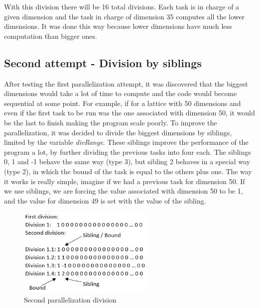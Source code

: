 \documentclass[conference]{IEEEtran}
\begin{document}
With this division there will be 16 total divisions. Each task is in charge of a given dimension and the task in charge of dimension 35 computes all the lower dimensions. It was done this way because lower dimensions have much less computation than bigger ones. 

\subsection{Second attempt - Division by siblings}
After testing the first parallelization attempt, it was discovered that the biggest dimensions would take a lot of time to compute and the code would become sequential at some point. For example, if for a lattice with 50 dimensions and even if the first task to be run was the one associated with dimension 50, it would be the last to finish making the program scale poorly.
To improve the parallelization, it was decided to divide the biggest dimensions by siblings, limited by the variable \emph{divRange}. These siblings improve the performance of the program a lot, by further dividing the previous tasks into four each. The siblings  0, 1 and -1 behave the same way (type 3), but sibling 2 behaves in a special way (type 2), in  which the bound of the task is equal to the others plus one. The way it works is really simple, imagine if we had a previous task for dimension 50. If we use siblings, we are forcing the value associated with dimension 50 to be 1, and the value for dimension 49 is set with the value of the sibling. 

\begin{figure}[ht!]
\centering
\includegraphics[width=65mm]{imgParallel/SegundaParalelizacao}
\caption{Second parallelization division}
\end{figure}
\end{document}
